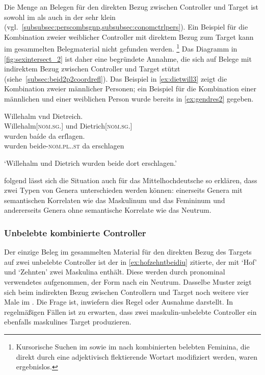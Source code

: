 Die Menge an Belegen für den direkten Bezug zwischen Controller und Target ist
sowohl im \CAO{} als auch in der \KC{} sehr klein
(vgl.~\cref{subsubsec:perscombsgnp,subsubsec:conomctrlpers}). Ein Beispiel für
die Kombination zweier weiblicher Controller mit direktem Bezug zum Target kann
im gesammelten Belegmaterial nicht gefunden werden.%
%
	\footnote{Kursorische Suchen im \CAO{} sowie im \REM{}
	nach kombinierten belebten Feminina, die direkt durch eine adjektivisch
	flektierende Wortart modifiziert werden, waren ergebnislos.}
%
Das Diagramm in \cref{fig:sexintersect_2} ist daher eine begründete Annahme, die
sich auf Belege mit indirektem Bezug zwischen Controller und Target stützt
(siehe~\cref{subsec:beid2p2coordrefl}). Das Beispiel in \cref{ex:dietwill3}
zeigt die Kombi\-nation zweier männlicher Personen; ein Beispiel für die
Kombination einer männlichen und einer weiblichen Person wurde bereits in
\cref{ex:gendres2} gegeben.

\begin{exe}
\ex\label{ex:dietwill3}
		\gll Willehalm vnd Dietreich. \\
			Willehalm[\textsc{nom.sg.\MascM}] und Dietrich[\textsc{nom.sg.\MascM}] \\
	\sn \gll wurden baíde da erſlagen. \\
			wurden beide-\textsc{nom.pl.\MascM.st} da erschlagen \\
		\begin{taggedline}{\parencites[\pno~83\vb, 36--37]{kc:C1}[vgl.][\pno~95\vb, 12--13]{kc:K}}
		\trans `Willehalm und Dietrich wurden beide dort erschlagen.'
		\end{taggedline}
\end{exe}

\textcites[576]{wechsler2009}[182]{wechslerzlatic2003} folgend lässt sich die
Situation auch für das Mittelhochdeutsche so erklären, dass zwei Typen von
Genera unterschieden werden können: einerseits Genera mit semantischen
Korrelaten wie das Maskulinum und das Femininum und andererseits Genera ohne
semantische Korrelate wie das Neutrum.

\subsubsection{Unbelebte kombinierte Controller}
\label{subsubsec:x+x_dir_inan}

Der einzige Beleg im gesammelten Material für den direkten Bezug des Targets
auf zwei unbelebte Controller ist der in \cref{ex:hofzehntbeidiu} zitierte, der
mit  `Hof' und  `Zehnten' zwei Maskulina
enthält. Diese werden durch pronominal verwendetes  aufgenommen,
der Form nach ein Neutrum. Dasselbe Muster zeigt sich beim indirekten Bezug
zwischen Controllern und Target noch weitere vier Male im \CAO{}. Die
Frage ist, inwiefern dies Regel oder Ausnahme darstellt. In regelmäßigen Fällen
ist zu erwarten, dass zwei maskulin-unbelebte Controller ein ebenfalls
maskulines Target produzieren.

